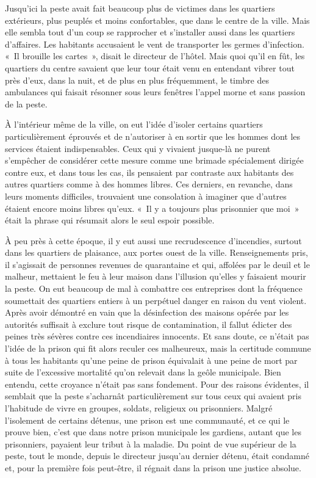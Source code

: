 \documentclass[french,twoside]{book} %
\begin{document}
Jusqu’ici la peste avait fait beaucoup plus de victimes dans les quartiers extérieurs, plus peuplés et moins confortables, que dans le centre de la ville. Mais elle sembla tout d’un coup se rapprocher et s’installer aussi dans les quartiers d’affaires. Les habitants accusaient le vent de transporter les germes d’infection. « Il brouille les cartes », disait le directeur de l’hôtel. Mais quoi qu’il en fût, les quartiers du centre savaient que leur tour était venu en entendant vibrer tout près d’eux, dans la nuit, et de plus en plus fréquemment, le timbre des ambulances qui faisait résonner sous leurs fenêtres l’appel morne et sans passion de la peste.\par
À l’intérieur même de la ville, on eut l’idée d’isoler certains quartiers particulièrement éprouvés et de n’autoriser à en sortir que les hommes dont les services étaient indispensables. Ceux qui y vivaient jusque-là ne purent s’empêcher de considérer cette mesure comme une brimade spécialement dirigée contre eux, et dans tous les cas, ils pensaient par contraste aux habitants des autres quartiers comme à des hommes libres. Ces derniers, en revanche, dans leurs moments difficiles, trouvaient une consolation à imaginer que d’autres étaient encore moins libres qu’eux. « Il y a toujours plus prisonnier que moi » était la phrase qui résumait alors le seul espoir possible.\par
À peu près à cette époque, il y eut aussi une recrudescence d’incendies, surtout dans les quartiers de plaisance, aux portes ouest de la ville. Renseignements pris, il s’agissait de personnes revenues de quarantaine et qui, affolées par le deuil et le malheur, mettaient le feu à leur maison dans l’illusion qu’elles y faisaient mourir la peste. On eut beaucoup de mal à combattre ces entreprises dont la fréquence soumettait des quartiers entiers à un perpétuel danger en raison du vent violent. Après avoir démontré en vain que la désinfection des maisons opérée par les autorités suffisait à exclure tout risque de contamination, il fallut édicter des peines très sévères contre ces incendiaires innocents. Et sans doute, ce n’était pas l’idée de la prison qui fit alors reculer ces malheureux, mais la certitude commune à tous les habitants qu’une peine de prison équivalait à une peine de mort par suite de l’excessive mortalité qu’on relevait dans la geôle municipale. Bien entendu, cette croyance n’était pas sans fondement. Pour des raisons évidentes, il semblait que la peste s’acharnât particulièrement sur tous ceux qui avaient pris l’habitude de vivre en groupes, soldats, religieux ou prisonniers. Malgré l’isolement de certains détenus, une prison est une communauté, et ce qui le prouve bien, c’est que dans notre prison municipale les gardiens, autant que les prisonniers, payaient leur tribut à la maladie. Du point de vue supérieur de la peste, tout le monde, depuis le directeur jusqu’au dernier détenu, était condamné et, pour la première fois peut-être, il régnait dans la prison une justice absolue.\par
\end{document}
